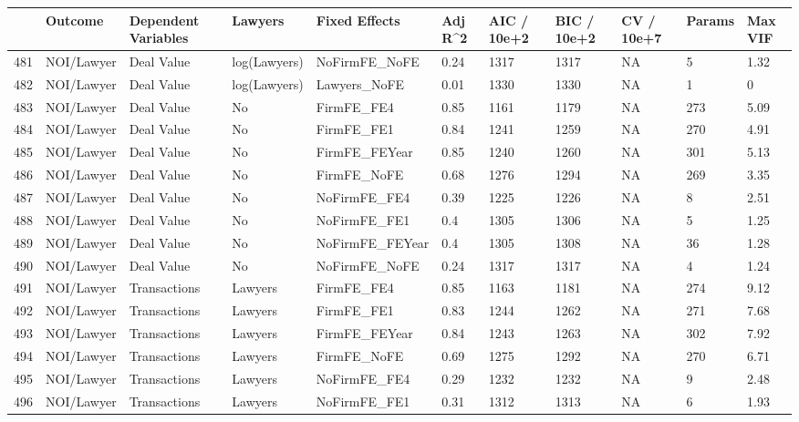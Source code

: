 \begin{table}[ht]
\centering
\begin{tabular}{rllllllllll}
  \hline
 & Outcome & Dependent Variables & Lawyers & Fixed Effects & Adj R^2 & AIC / 10e+2 & BIC / 10e+2 & CV / 10e+7 & Params & Max VIF \\ 
  \hline
481 & NOI/Lawyer & Deal Value & log(Lawyers) & NoFirmFE\_NoFE & 0.24 & 1317 & 1317 & NA & 5 & 1.32 \\ 
  482 & NOI/Lawyer & Deal Value & log(Lawyers) & Lawyers\_NoFE & 0.01 & 1330 & 1330 & NA & 1 & 0 \\ 
  483 & NOI/Lawyer & Deal Value & No & FirmFE\_FE4 & 0.85 & 1161 & 1179 & NA & 273 & 5.09 \\ 
  484 & NOI/Lawyer & Deal Value & No & FirmFE\_FE1 & 0.84 & 1241 & 1259 & NA & 270 & 4.91 \\ 
  485 & NOI/Lawyer & Deal Value & No & FirmFE\_FEYear & 0.85 & 1240 & 1260 & NA & 301 & 5.13 \\ 
  486 & NOI/Lawyer & Deal Value & No & FirmFE\_NoFE & 0.68 & 1276 & 1294 & NA & 269 & 3.35 \\ 
  487 & NOI/Lawyer & Deal Value & No & NoFirmFE\_FE4 & 0.39 & 1225 & 1226 & NA & 8 & 2.51 \\ 
  488 & NOI/Lawyer & Deal Value & No & NoFirmFE\_FE1 & 0.4 & 1305 & 1306 & NA & 5 & 1.25 \\ 
  489 & NOI/Lawyer & Deal Value & No & NoFirmFE\_FEYear & 0.4 & 1305 & 1308 & NA & 36 & 1.28 \\ 
  490 & NOI/Lawyer & Deal Value & No & NoFirmFE\_NoFE & 0.24 & 1317 & 1317 & NA & 4 & 1.24 \\ 
  491 & NOI/Lawyer & Transactions & Lawyers & FirmFE\_FE4 & 0.85 & 1163 & 1181 & NA & 274 & 9.12 \\ 
  492 & NOI/Lawyer & Transactions & Lawyers & FirmFE\_FE1 & 0.83 & 1244 & 1262 & NA & 271 & 7.68 \\ 
  493 & NOI/Lawyer & Transactions & Lawyers & FirmFE\_FEYear & 0.84 & 1243 & 1263 & NA & 302 & 7.92 \\ 
  494 & NOI/Lawyer & Transactions & Lawyers & FirmFE\_NoFE & 0.69 & 1275 & 1292 & NA & 270 & 6.71 \\ 
  495 & NOI/Lawyer & Transactions & Lawyers & NoFirmFE\_FE4 & 0.29 & 1232 & 1232 & NA & 9 & 2.48 \\ 
  496 & NOI/Lawyer & Transactions & Lawyers & NoFirmFE\_FE1 & 0.31 & 1312 & 1313 & NA & 6 & 1.93 \\ 

\end{tabular}
\end{table}
